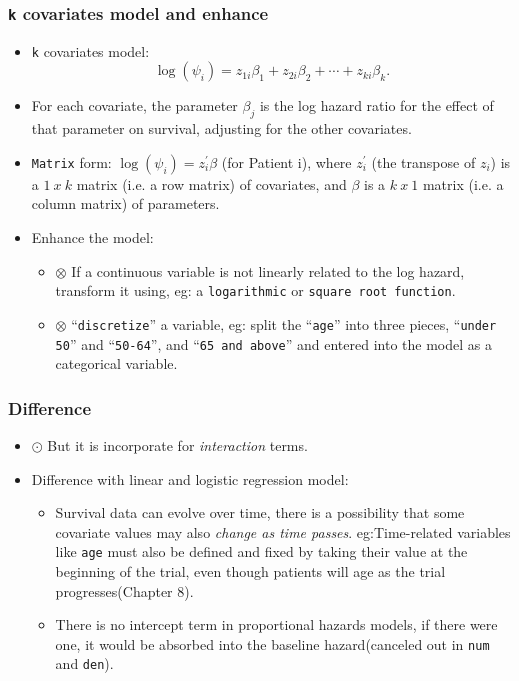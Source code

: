 \documentclass{beamer}
\newcommand{\empr}[1]{{\emph{\color{red}#1}}}
\begin{document}
\pagebreak
\begin{frame}
\frametitle{\texttt{k} covariates model and enhance}	
\begin{itemize}
\item \texttt{k} covariates model:
\begin{equation}
\log(\psi_i) = z_{1i}\beta_1 + z_{2i}\beta_2 + \cdots + z_{ki}\beta_k. 
\end{equation}
\item For each covariate, the parameter $\beta_j$ is the log hazard ratio for the effect of that parameter on survival, adjusting for the other covariates.
\item \texttt{Matrix} form: $\log(\psi_i)=z_{i}^{'}\beta$ (for Patient i), where $z_{i}^{'}$ (the transpose of $z_i$) is a $1\ x\ k$ matrix (i.e. a row matrix) of covariates, and $\beta$ is a $k\ x\ 1$ matrix (i.e. a column matrix) of parameters.
\item {\color{red}Enhance} the model: 
\begin{itemize}
\item {\color{blue}$\otimes$} If a continuous variable is not linearly related to the log hazard, transform it using, eg: a \texttt{logarithmic} or \texttt{square root function}.
\item  {\color{purple}$\otimes$} ``\texttt{discretize}'' a variable, eg: split the ``\texttt{age}'' into three pieces, ``\texttt{under 50}'' and ``\texttt{50-64}'', and ``\texttt{65 and above}'' and entered into the model as a categorical variable.
\end{itemize} 
\end{itemize} 
\end{frame}

\pagebreak
\begin{frame}
\frametitle{Difference}	
\begin{itemize}
\item {\color{purple}$\odot$} But it is incorporate for \empr{interaction} terms.
\item Difference with linear and logistic regression model:
\begin{itemize}
\item Survival data can evolve over time, there is a possibility that some covariate values may also \empr{change as time passes}.
eg:Time-related variables like \texttt{age} must also be defined and fixed by taking their value at the beginning of the trial, even though patients will age as the trial progresses(Chapter 8).
\item There is {\color{red}no intercept term} in proportional hazards models, if there were one, it would be absorbed into the baseline hazard(canceled out in \texttt{num} and \texttt{den}).

\end{itemize} 
\end{itemize} 
\end{frame}
\end{document}
